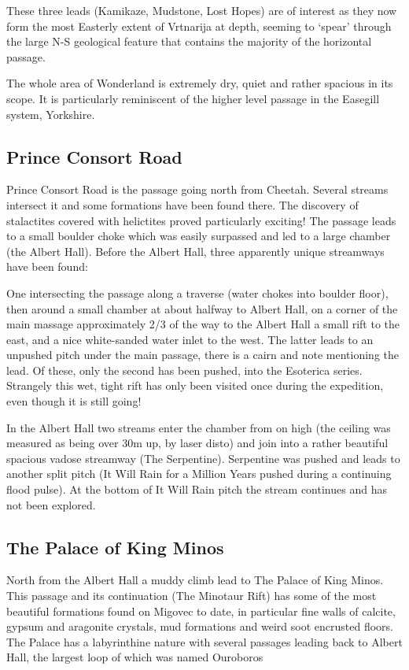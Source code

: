 These three leads (Kamikaze, Mudstone, Lost Hopes) are of interest as
they now form the most Easterly extent of Vrtnarija at depth, seeming to
`spear' through the large N-S geological feature that contains the
majority of the horizontal passage.

The whole area of Wonderland is extremely dry, quiet and rather spacious
in its scope. It is particularly reminiscent of the higher level passage
in the Easegill system, Yorkshire.

\subsection{Prince Consort Road}

Prince Consort Road is the passage going north from Cheetah. Several
streams intersect it and some formations have been found there. The
discovery of stalactites covered with helictites proved particularly
exciting! The passage leads to a small boulder choke which was easily
surpassed and led to a large chamber (the Albert Hall). Before the
Albert Hall, three apparently unique streamways have been found:

One intersecting the passage along a traverse (water chokes into boulder
floor), then around a small chamber at about halfway to Albert Hall, on
a corner of the main massage approximately 2/3 of the way to the Albert
Hall a small rift to the east, and a nice white-sanded water inlet to
the west. The latter leads to an unpushed pitch under the main passage,
there is a cairn and note mentioning the lead. Of these, only the second
has been pushed, into the Esoterica series. Strangely this wet, tight
rift has only been visited once during the expedition, even though it is
still going!

In the Albert Hall two streams enter the chamber from on high (the
ceiling was measured as being over 30m up, by laser disto) and join into
a rather beautiful spacious vadose streamway (The Serpentine).
Serpentine was pushed and leads to another split pitch (It Will Rain for
a Million Years \textemdash{} pushed during a continuing flood pulse).
At the bottom of It Will Rain pitch the stream continues and has not
been explored.

\subsection{The Palace of King Minos}

North from the Albert Hall a muddy climb lead to The Palace of King
Minos. This passage and its continuation (The Minotaur Rift) has some of
the most beautiful formations found on Migovec to date, in particular
fine walls of calcite, gypsum and aragonite crystals, mud formations and
weird soot encrusted floors. The Palace has a labyrinthine nature with
several passages leading back to Albert Hall, the largest loop of which
was named Ouroboros

